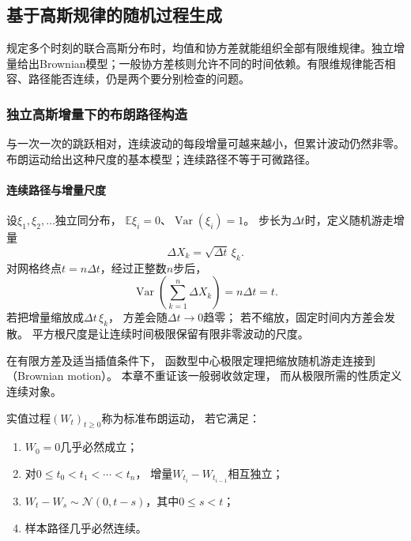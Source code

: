 \subsection{基于高斯规律的随机过程生成}

规定多个时刻的联合高斯分布时，均值和协方差就能组织全部有限维规律。独立增量给出Brownian模型；一般协方差核则允许不同的时间依赖。有限维规律能否相容、路径能否连续，仍是两个要分别检查的问题。
\label{sec:rv-gaussian-generation}

\subsubsection{独立高斯增量下的布朗路径构造}
\label{sec:dynamical-brownian-motion}
与一次一次的跳跃相对，连续波动的每段增量可越来越小，但累计波动仍然非零。布朗运动给出这种尺度的基本模型；连续路径不等于可微路径。

\paragraph{连续路径与增量尺度}

设$\xi_{1},\xi_{2},\ldots$独立同分布， $\mathbb{E}\xi_{i}=0$、$\operatorname{Var}
(\xi_{i})=1$。 步长为$\Delta t$时，定义随机游走增量
\[
	\Delta X_{k}=\sqrt{\Delta t}\,\xi_{k}.
\]
对网格终点$t=n\Delta t$，经过正整数$n$步后，
\[
	\operatorname{Var}\left( \sum_{k=1}^{n}\Delta X_{k}\right) = n\Delta t=t.
\]
若把增量缩放成$\Delta t\,\xi_{k}$， 方差会随$\Delta t\to0$趋零；
若不缩放，固定时间内方差会发散。
平方根尺度是让连续时间极限保留有限非零波动的尺度。

在有限方差及适当插值条件下， 函数型中心极限定理把缩放随机游走连接到（Brownian motion）。 本章不重证该一般弱收敛定理，
而从极限所需的性质定义连续对象。

\begin{definition}[标准布朗运动]
	\label{def:dynamical-standard-brownian-motion} 实值过程$(W_{t})_{t\geq0}$称为标准布朗运动，
	若它满足：
	\begin{enumerate}
		\item $W_{0}=0$几乎必然成立；

		\item 对$0\leq t_{0}<t_{1}<\cdots<t_{n}$， 增量$W_{t_i}-W_{t_{i-1}}$相互独立；

		\item $W_{t}-W_{s}\sim\mathcal{N}(0,t-s)$，其中$0\leq s<t$；

		\item 样本路径几乎必然连续。
	\end{enumerate}
\end{definition}

